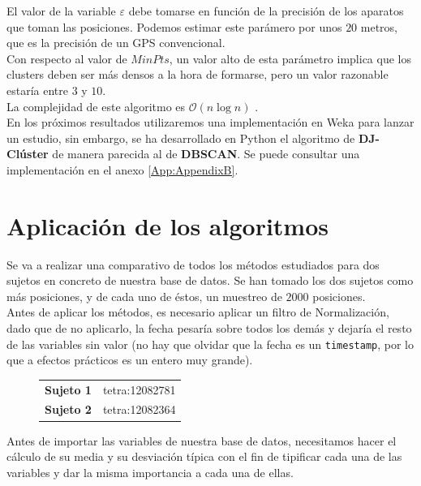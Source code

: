 \documentclass[a4paper, 12pt]{article}
\begin{document}
El valor de la variable $\varepsilon$ debe tomarse\cite{clusteringApproach} en funci\'on de la precisi\'on de los aparatos que toman las posiciones. Podemos estimar este par\'amero por unos $20$ metros, que es la precisi\'on de un GPS convencional. \\

Con respecto al valor de $MinPts$, un valor alto de esta par\'ametro implica que los clusters deben ser m\'as densos a la hora de formarse, pero un valor razonable\cite{clusteringApproach} estar\'ia entre $3$ y $10$.\\

La complejidad de este algoritmo es $\mathcal{O}(n\log{}n)$ \cite{importantPlaces}.\\

En los pr\'oximos resultados utilizaremos una implementaci\'on en Weka para lanzar un estudio, sin embargo, se ha desarrollado en Python el algoritmo de \textbf{DJ-Cl\'uster} de manera parecida al de \textbf{DBSCAN}. Se puede consultar una implementaci\'on en el anexo \ref{App:AppendixB}.


\pagebreak
\section{Aplicaci\'on de los algoritmos}


Se va a realizar una comparativo de todos los m\'etodos estudiados para dos sujetos en concreto de nuestra base de datos. Se han tomado los dos sujetos como m\'as posiciones, y de cada uno de \'estos, un muestreo de $2000$ posiciones. \\

Antes de aplicar los m\'etodos, es necesario aplicar un filtro de Normalizaci\'on, dado que de no aplicarlo, la fecha pesar\'ia sobre todos los dem\'as y dejar\'ia el resto de las variables sin valor (no hay que olvidar que la fecha es un \texttt{timestamp}, por lo que a efectos pr\'acticos es un entero muy grande). 

\begin{figure}[H]
	\begin{tabular}{| l | l |}
	\hline
		\textbf{Sujeto 1} & tetra:12082781 \\
		\textbf{Sujeto 2} & tetra:12082364 \\	
	\hline
	\end{tabular}
\end{figure}

Antes de importar las variables de nuestra base de datos, necesitamos hacer el c\'alculo de su media y su desviaci\'on t\'ipica con el fin de tipificar cada una de las variables y dar la misma importancia a cada una de ellas. \\
\end{document}
